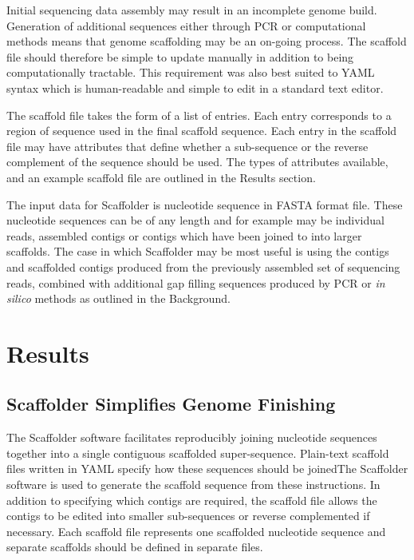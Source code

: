 \documentclass[10pt]{bmc_article}
\newenvironment{bmcformat}{\begin{raggedright}\baselineskip20pt\sloppy\setboolean{publ}{false}}{\end{raggedright}\baselineskip20pt\sloppy}
\begin{document}
\begin{bmcformat}
Initial sequencing data assembly may result in an incomplete genome build.
Generation of additional sequences either through PCR or computational methods
means that genome scaffolding may be an on-going process. The scaffold file
should therefore be simple to update manually in addition to being
computationally tractable. This requirement was also best suited to YAML syntax
which is human-readable and simple to edit in a standard text editor. \pb

The scaffold file takes the form of a list of entries. Each entry corresponds
to a region of sequence used in the final scaffold sequence. Each entry in the
scaffold file may have attributes that define whether a sub-sequence or the
reverse complement of the sequence should be used. The types of attributes
available, and an example scaffold file are outlined in the Results section.
\pb

The input data for Scaffolder is nucleotide sequence in FASTA format file.
These nucleotide sequences can be of any length and for example may be
individual reads, assembled contigs or contigs which have been joined to into
larger scaffolds. The case in which Scaffolder may be most useful is using the
contigs and scaffolded contigs produced from the previously assembled set of
sequencing reads, combined with additional gap filling sequences produced by
PCR or \emph{in silico} methods as outlined in the Background. \pb

\clearpage

\section*{Results} %

\subsection*{Scaffolder Simplifies Genome Finishing} %

The Scaffolder software facilitates reproducibly joining nucleotide sequences
together into a single contiguous scaffolded super-sequence. Plain-text
scaffold files written in YAML specify how these sequences should be joinedThe
Scaffolder software is used to generate the scaffold sequence from these
instructions. In addition to specifying which contigs are required, the
scaffold file allows the contigs to be edited into smaller sub-sequences or
reverse complemented if necessary. Each scaffold file represents one scaffolded
nucleotide sequence and separate scaffolds should be defined in separate files.
\pb


\end{bmcformat}
\end{document}
